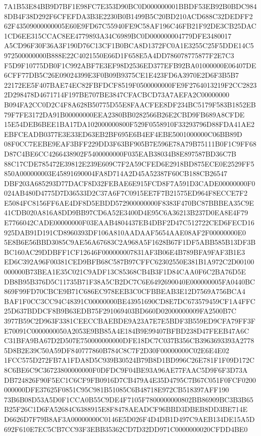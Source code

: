 \documentclass[UTF8,fontset=fandol,zihao=-4,a4paper]{ctexart}
\begin{document}
{{7A1B53E84BB9D7BF1E98FC7E353D90BC0D000000001BBDF53EB92B0BDC9848DB4F38D292F6CFEFDA3B3E2230B0B1499B5C20BD210ACD688C32DEDFF2
62F43509000000005E60E9FD67C55940FE9C58AF196C46FB21F92DE3CB25DAC1CD6EE315CCAC8EE4779893A34C6989BC0D000000004779DFE3480017
A5CD96F30F36A3F190D76C13CF1B0BCA8D1372FC0A1E3255C25F5DDE14C5972500000000B888E22C4021550E66D1F658E5A4DD786078775877F2E7C3
F5D9F10775DB0F1C992ABF7E3EF98D2536ED377EFB92BA01000000E06407DE6CFF77DB5C26E09024399E3F0B09B9375CE1E423FD6A3970E2D6F3B5B7
22172EE5F407BAE74EC82FBFDCF8519F0500000000FE9F2764013219F2CC28232D298478D4671714F197BE707BE3847CFACBCD73A7AEFA2C00000000
B094FA2CC0D2C4F8A628B50775D55E8FAACFEE8DF234BC5179F583B1852EB79F7FE3172DA91B00000000EEA2380BB0282566B26E2CBD9FB689A8CFDE
15E54DEB6BEE1BA17DA102000000800F529F0558910F33293796D88FDA41AE2EBFCEADB0377E3E33ED63EB2BF695E6B4EF4EBE5001000000C06BB89D
08F0CC7EEBE9EAF3BFF229DD3F63BF905B7E596E78A79B75111B0F1C9FF68D87C4BE6CC4266438902F5400000000F035EAB38034B8E897587BD36C7B
88C17CDE785472E39812E239E609C7F2A59CFED6E2918BD875ECE0E2529FF5850A000000003E45891690004FA8D714A2D45A52387F60CB188CB26547
DBF203A685293D77DACF8D32FEBAE6E915FCD8F7A591D3CADE00000000F0024AB480D4775D7D36533D2C37A6F7C0915EE7F7B21575ED964F8ECCE7F2
E5084FC8156FF6AE4DF8D5EBDD572900000000F8383F470BC87BBBEA35C9E41CDB020A816A8DD9BB97CD6A52E3400D4E95C6A36213B237D0EA8E4F79
E7766042CADE00000000F03EAAB4804437EB4DBF2D47C512722CED6FECD16925DAB91D191CD8960393DF106A810AADAAF5654AAE08AF2F00000000E0
5E8B6E56BBD3085C9AE56A67683C2A968A5F1628B67F1DF5ABB585B13DF3BBC160AC29DDBFF1CF12646F000000007831AF3B06E4B789BFA9FAF3B1E3
ED6C392A96F00381CED9BFB68C587B97CFFC62302550E381B1A972C2D00100000000B73BEA1E35C021C9ADF13C85368CB4B3F1D84CAA0F6C2BA76D5E
DB8B95B376D5C11735B71F38A5CB2DC7C6E6492690040E000000005FA0440BC869F99FD70CBCE9B71C686EC978EEB3C0CFBBEAB3E12D7569A756BCA4
BAF1F0CC3CC94C48391C00000000BE43951690CD8E7DC673579459CF1A4FFC25D637BDDCF8B9B63EDB75F291069403BD660D02000000009FA2500B7C
3977B59C2D963F3381CEECCBAEBDE9A23A7E7E5BDF3B559ED9CFA79FF3FE70091C0000000050A2053E9BB85A4E184B9E99407BFBD238D47FEEB47A6C
C31BFA9BA67D2D507E750000000000DFE18DC7C037B356CB3963693393A27785D8B2E39C50A59DF840777860B784C8C7F2D30F00000000C02E6E4E02
1FCC575D272FB7A1FDA8D5C939B30524B79B8D1BD996C26E781F1F09D172C8C6BE6C9C36723800000000F0DFDC9F04BE93A96AE77FAAC5D9F6F3D73A
DB724826F90F5EC1C6CF9FB0916D7CB479A4E35D4795C7B67C051F0FCF0200000000DFE37625F0851C95C981B51085C6B48718E972CB518397AFF190
73B6B08D53A5D0F1CCA0B55C9DE4F7105F7800000000802BB86909BC3B3B65B25F26C1D6FA52684C6388915E8F8478AEADCF96BBD3DBEB8DD3BE714E
D6626D7F79B8AF3A00000000C0146E5D026F4D4DB1D497C9AEB134DE15A5D692F610E7EC5CB7CC93F3EBB35362CD7D32DD971C0000000020CFDD4BE0
}}
\end{document}
